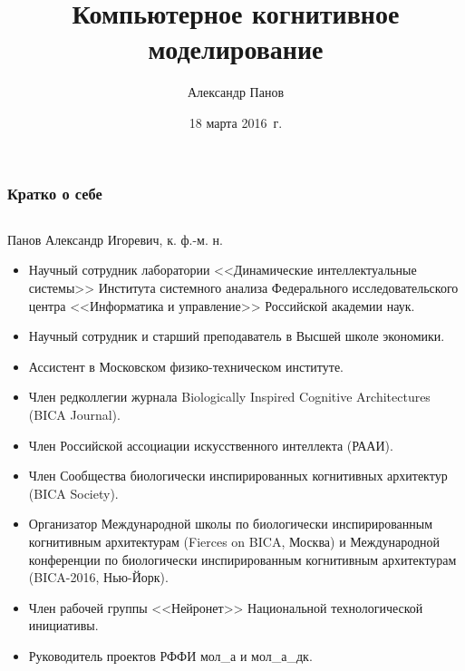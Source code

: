\documentclass[default]{beamer}
\begin{document}
	
	\title[Bio- and psycho-inspired methods in AI]{Компьютерное когнитивное моделирование}
	\author[Панов]{Александр Панов}
	\date{18 марта 2016~г.} 
	
	\begin{frame}
		\titlepage
	\end{frame}
	
	\begin{frame}
		\frametitle{Кратко о себе}
		\scriptsize
		\begin{columns}
			\begin{column}{0.85\textwidth}
				Панов Александр Игоревич, к. ф.-м. н.
				\begin{itemize}
					\item Научный сотрудник лаборатории <<Динамические интеллектуальные системы>> Института системного анализа Федерального исследовательского центра <<Информатика и управление>> Российской академии наук.
					\item Научный сотрудник и старший преподаватель в Высшей школе экономики.
					\item Ассистент в Московском физико-техническом институте.
					\item Член редколлегии журнала Biologically Inspired Cognitive Architectures (BICA Journal).
					\item Член Российской ассоциации искусственного интеллекта (РААИ).
					\item Член Сообщества биологически инспирированных когнитивных архитектур (BICA Society).
					\item Организатор Международной	школы по биологически инспирированным когнитивным архитектурам (Fierces on BICA, Москва) и Международной конференции по биологически инспирированным когнитивным архитектурам (BICA-2016, Нью-Йорк).
					\item Член рабочей группы <<Нейронет>> Национальной технологической инициативы.
					\item Руководитель проектов РФФИ мол\_а и мол\_а\_дк.
				\end{itemize}
			\end{column}
			

\end{columns}
\end{frame}
\end{document}
